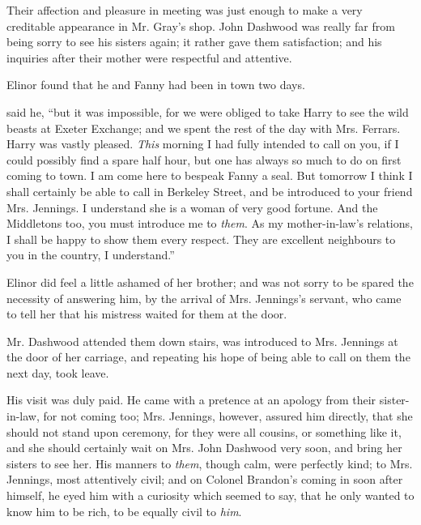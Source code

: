Their affection and pleasure in meeting was just enough to make a very creditable appearance in Mr. Gray's shop. John Dashwood was really far from being sorry to see his sisters again; it rather gave them satisfaction; and his inquiries after their mother were respectful and attentive.

Elinor found that he and Fanny had been in town two days.

 said he, “but it was impossible, for we were obliged to take Harry to see the wild beasts at Exeter Exchange; and we spent the rest of the day with Mrs. Ferrars. Harry was vastly pleased. {\em This} morning I had fully intended to call on you, if I could possibly find a spare half hour, but one has always so much to do on first coming to town. I am come here to bespeak Fanny a seal. But tomorrow I think I shall certainly be able to call in Berkeley Street, and be introduced to your friend Mrs. Jennings. I understand she is a woman of very good fortune. And the Middletons too, you must introduce me to {\em them}. As my mother-in-law's relations, I shall be happy to show them every respect. They are excellent neighbours to you in the country, I understand.”



Elinor did feel a little ashamed of her brother; and was not sorry to be spared the necessity of answering him, by the arrival of Mrs. Jennings's servant, who came to tell her that his mistress waited for them at the door.

Mr. Dashwood attended them down stairs, was introduced to Mrs. Jennings at the door of her carriage, and repeating his hope of being able to call on them the next day, took leave.

His visit was duly paid. He came with a pretence at an apology from their sister-in-law, for not coming too;  Mrs. Jennings, however, assured him directly, that she should not stand upon ceremony, for they were all cousins, or something like it, and she should certainly wait on Mrs. John Dashwood very soon, and bring her sisters to see her. His manners to {\em them}, though calm, were perfectly kind; to Mrs. Jennings, most attentively civil; and on Colonel Brandon's coming in soon after himself, he eyed him with a curiosity which seemed to say, that he only wanted to know him to be rich, to be equally civil to {\em him}.

